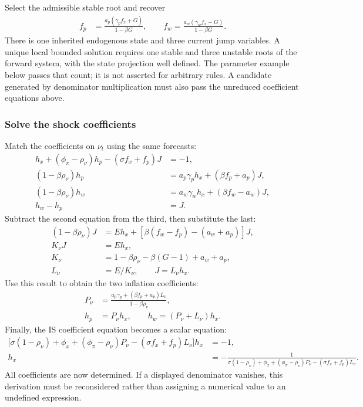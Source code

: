Select the admissible stable root and recover
\begin{align}
 f_p&=\frac{a_p(\gamma_pf_x+G)}{1-\beta G},\qquad
 f_w=\frac{a_w(\gamma_wf_x-G)}{1-\beta G}.
\end{align}
There is one inherited endogenous state and three current jump variables.
A unique local bounded solution requires one stable and three unstable roots
of the forward system, with the state projection well defined. The parameter
example below passes that count; it is not asserted for arbitrary rules.
A candidate generated by denominator multiplication must also pass the
unreduced coefficient equations above.

\subsubsection{Solve the shock coefficients}

Match the coefficients on $\nu_t$ using the same forecasts:
\begin{align}
 [\sigma(1-\rho_\nu)+\phi_x]h_x
      +(\phi_\pi-\rho_\nu)h_p-(\sigma f_x+f_p)J&=-1,\\
 (1-\beta\rho_\nu)h_p&=a_p\gamma_ph_x+(\beta f_p+a_p)J,\\
 (1-\beta\rho_\nu)h_w&=a_w\gamma_wh_x+(\beta f_w-a_w)J,\\
 h_w-h_p&=J.
\end{align}
Subtract the second equation from the third, then substitute the last:
\begin{align}
 (1-\beta\rho_\nu)J
 &=E h_x+[\beta(f_w-f_p)-(a_w+a_p)]J,\\
 K_\nu J&=E h_x,\\
 K_\nu&=1-\beta\rho_\nu-\beta(G-1)+a_w+a_p,\\
 L_\nu&=E/K_\nu,\qquad J=L_\nu h_x.
\end{align}
Use this result to obtain the two inflation coefficients:
\begin{align}
 P_\nu&=\frac{a_p\gamma_p+(\beta f_p+a_p)L_\nu}{1-\beta\rho_\nu},\\
 h_p&=P_\nu h_x,\qquad h_w=(P_\nu+L_\nu)h_x.
\end{align}
Finally, the IS coefficient equation becomes a scalar equation:
\begin{align}
 \big[\sigma(1-\rho_\nu)+\phi_x
       +(\phi_\pi-\rho_\nu)P_\nu
       -(\sigma f_x+f_p)L_\nu\big]h_x&=-1,\\
 h_x&=-\frac1{\sigma(1-\rho_\nu)+\phi_x
       +(\phi_\pi-\rho_\nu)P_\nu-(\sigma f_x+f_p)L_\nu}.
 \label{eq:sw-shock-coefficients}
\end{align}
All coefficients are now determined. If a displayed denominator vanishes,
this derivation must be reconsidered rather than assigning a numerical value
to an undefined expression.

